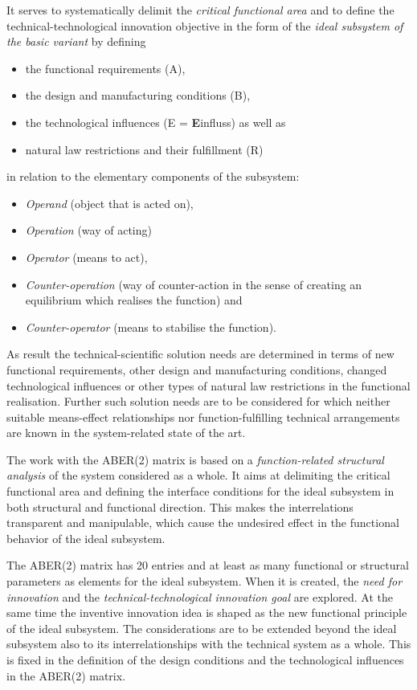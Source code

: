\documentclass[12pt,a4paper]{article}
\begin{document}
It serves to systematically delimit the \emph{critical functional area} and to
define the technical-technological innovation objective in the form of the
\emph{ideal subsystem of the basic variant} by defining
\begin{itemize}
\item the functional requirements (A),
\item the design and manufacturing conditions (B),
\item the technological influences (E = \textbf{E}influss) as well as
\item natural law restrictions and their fulfillment (R)
\end{itemize}
in relation to the elementary components of the subsystem:
\begin{itemize}
\item \emph{Operand} (object that is acted on),
\item \emph{Operation} (way of acting)
\item \emph{Operator} (means to act),
\item \emph{Counter-operation} (way of counter-action in the sense of creating
  an equilibrium which realises the function) and
\item \emph{Counter-operator} (means to stabilise the function).
\end{itemize}

As result the technical-scientific solution needs are determined in terms of
new functional requirements, other design and manufacturing conditions,
changed technological influences or other types of natural law restrictions in
the functional realisation. Further such solution needs are to be considered
for which neither suitable means-effect relationships nor function-fulfilling
technical arrangements are known in the system-related state of the art.

The work with the ABER(2) matrix is based on a \emph{function-related
  structural analysis} of the system considered as a whole. It aims at
delimiting the critical functional area and defining the interface conditions
for the ideal subsystem in both structural and functional direction. This
makes the interrelations transparent and manipulable, which cause the
undesired effect in the functional behavior of the ideal subsystem.

The ABER(2) matrix has 20 entries and at least as many functional or
structural parameters as elements for the ideal subsystem. When it is created,
the \emph{need for innovation} and the \emph{technical-technological
  innovation goal} are explored. At the same time the inventive innovation
idea is shaped as the new functional principle of the ideal subsystem. The
considerations are to be extended beyond the ideal subsystem also to its
interrelationships with the technical system as a whole. This is fixed in the
definition of the design conditions and the technological influences in the
ABER(2) matrix.
\end{document}

